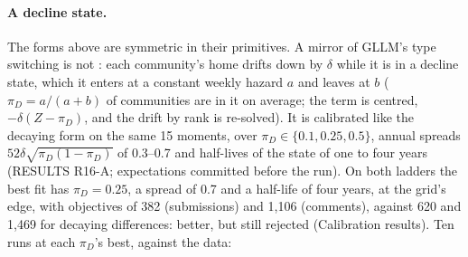 \documentclass[10pt]{article}
\begin{document}
\paragraph{A decline state.} The forms above are symmetric in their primitives. A mirror of GLLM's type switching is not \cite{gllm2016}: each community's home drifts down by $\delta$ while it is in a decline state, which it enters at a constant weekly hazard $a$ and leaves at $b$ ($\pi_D = a/(a+b)$ of communities are in it on average; the term is centred, $-\delta(Z - \pi_D)$, and the drift by rank is re-solved). It is calibrated like the decaying form on the same 15 moments, over $\pi_D \in \{0.1, 0.25, 0.5\}$, annual spreads $52\delta\sqrt{\pi_D(1-\pi_D)}$ of 0.3--0.7 and half-lives of the state of one to four years (RESULTS R16-A; expectations committed before the run). On both ladders the best fit has $\pi_D = 0.25$, a spread of 0.7 and a half-life of four years, at the grid's edge, with objectives of 382 (submissions) and 1,106 (comments), against 620 and 1,469 for decaying differences: better, but still rejected (Calibration results). Ten runs at each $\pi_D$'s best, against the data:
\begin{center}\small{}\end{center}
\end{document}
